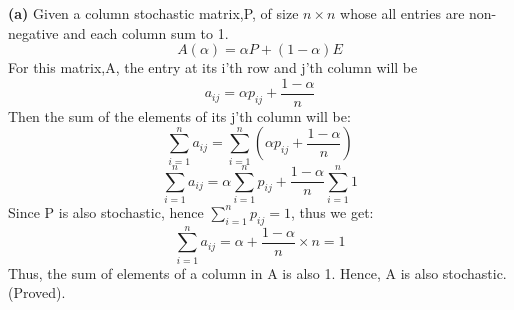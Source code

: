 \documentclass{article}
\renewcommand\part[1]{\vspace{.10in}\textbf{(#1)}}
\begin{document}
  \part{a} Given a column stochastic matrix,P, of size $n \times n$ whose all entries are non-negative and each column sum to 1. 
   \[A(\alpha) = \alpha P + (1-\alpha)E \]
   For this matrix,A, the entry at its i'th row and j'th column will be
   \[a_{ij} = \alpha p_{ij} + \dfrac{1-\alpha}{n}\]
   Then the sum of the elements of its j'th column will be:
   \[ \sum_{i=1}^n a_{ij} = \sum_{i=1}^n (\alpha p_{ij} + \dfrac{1-\alpha}{n}) \]
   \[ \sum_{i=1}^n a_{ij} = \alpha \sum_{i=1}^n p_{ij} + \dfrac{1-\alpha}{n}\sum_{i=1}^n 1 \]
   Since P is also stochastic, hence $\sum_{i=1}^n p_{ij} = 1$, thus we get: \newline
   \[ \sum_{i=1}^n a_{ij} = \alpha + \dfrac{1-\alpha}{n}\times n = 1 \]
   Thus, the sum of elements of a column in A is also 1. Hence, A is also stochastic. (Proved). \newline
\end{document}
